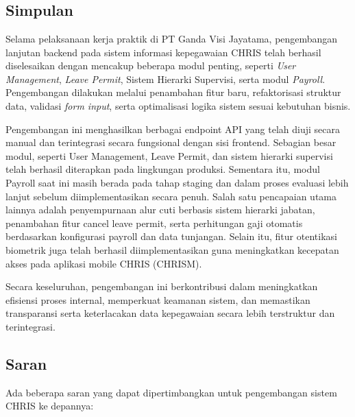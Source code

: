 \chapter{\babEmpat}
\section{Simpulan}
Selama pelaksanaan kerja praktik di PT Ganda Visi Jayatama, pengembangan lanjutan backend pada sistem informasi kepegawaian CHRIS telah berhasil diselesaikan dengan mencakup beberapa modul penting, seperti \textit{User Management}, \textit{Leave Permit}, Sistem Hierarki Supervisi, serta modul \textit{Payroll}. Pengembangan dilakukan melalui penambahan fitur baru, refaktorisasi struktur data, validasi \textit{form input}, serta optimalisasi logika sistem sesuai kebutuhan bisnis.

Pengembangan ini menghasilkan berbagai endpoint API yang telah diuji secara manual dan terintegrasi secara fungsional dengan sisi frontend. Sebagian besar modul, seperti User Management, Leave Permit, dan sistem hierarki supervisi telah berhasil diterapkan pada lingkungan produksi. Sementara itu, modul Payroll saat ini masih berada pada tahap staging dan dalam proses evaluasi lebih lanjut sebelum diimplementasikan secara penuh. Salah satu pencapaian utama lainnya adalah penyempurnaan alur cuti berbasis sistem hierarki jabatan, penambahan fitur cancel leave permit, serta perhitungan gaji otomatis berdasarkan konfigurasi payroll dan data tunjangan. Selain itu, fitur otentikasi biometrik juga telah berhasil diimplementasikan guna meningkatkan kecepatan akses pada aplikasi mobile CHRIS (CHRISM).

Secara keseluruhan, pengembangan ini berkontribusi dalam meningkatkan efisiensi proses internal, memperkuat keamanan sistem, dan memastikan transparansi serta keterlacakan data kepegawaian secara lebih terstruktur dan terintegrasi.


\section{Saran}
Ada beberapa saran yang dapat dipertimbangkan untuk pengembangan sistem CHRIS ke depannya:

